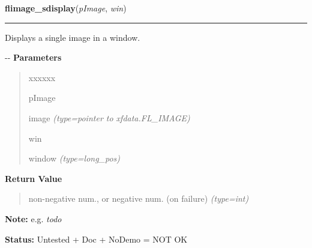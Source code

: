 \hspace{.8\funcindent}\begin{boxedminipage}{\funcwidth}

    \raggedright \textbf{flimage\_sdisplay}(\textit{pImage}, \textit{win})

    \vspace{-1.5ex}

    \rule{\textwidth}{0.5\fboxrule}
\setlength{\parskip}{2ex}

Displays a single image in a window.

-{}-
\setlength{\parskip}{1ex}
      \textbf{Parameters}
      \vspace{-1ex}

      \begin{quote}
        \begin{Ventry}{xxxxxx}

          \item[pImage]


image
            {\it (type=pointer to xfdata.FL\_IMAGE)}

          \item[win]


window
            {\it (type=long\_pos)}

        \end{Ventry}

      \end{quote}

      \textbf{Return Value}
    \vspace{-1ex}

      \begin{quote}

non-negative num., or negative num. (on failure)
      {\it (type=int)}

      \end{quote}

\textbf{Note:} 
e.g. \emph{todo}


\textbf{Status:} 
Untested + Doc + NoDemo = NOT OK


    \end{boxedminipage}

    \label{xformslib:flflimage:flimage_convert}

    \vspace{0.5ex}

